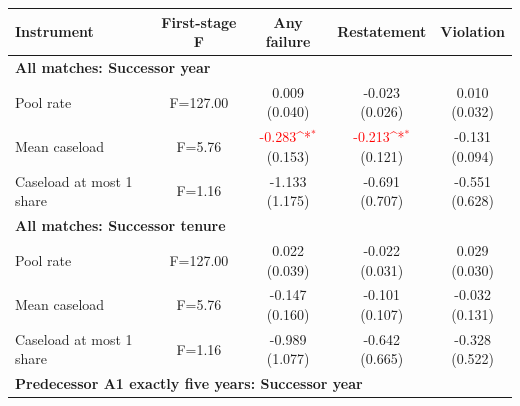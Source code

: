 \documentclass[10pt]{article}
\newcommand{\sym}[1]{\textsuperscript{#1}}
\begin{document}
\begin{minipage}{19cm}\fontsize{10}{12}\selectfont\setlength{\tabcolsep}{4pt}\renewcommand{\arraystretch}{1.12}


\def\sym#1{\ifmmode^{#1}\else\(^{#1}\)\fi}
\centering
{}
\begin{threeparttable}
\begin{tabular}{p{}cccc}
\toprule
Instrument & First-stage F & Any failure & Restatement & Violation \\
\midrule
\multicolumn{5}{l}{\textbf{All matches: Successor year}} \\
Pool rate & F=127.00 & \shortstack{0.009\\(0.040)} & \shortstack{-0.023\\(0.026)} & \shortstack{0.010\\(0.032)} \\
Mean caseload & F=5.76 & \shortstack{\textcolor{red}{-0.283\sym{*}}\\(0.153)} & \shortstack{\textcolor{red}{-0.213\sym{*}}\\(0.121)} & \shortstack{-0.131\\(0.094)} \\
Caseload at most 1 share & F=1.16 & \shortstack{-1.133\\(1.175)} & \shortstack{-0.691\\(0.707)} & \shortstack{-0.551\\(0.628)} \\
\multicolumn{5}{l}{\textbf{All matches: Successor tenure}} \\
Pool rate & F=127.00 & \shortstack{0.022\\(0.039)} & \shortstack{-0.022\\(0.031)} & \shortstack{0.029\\(0.030)} \\
Mean caseload & F=5.76 & \shortstack{-0.147\\(0.160)} & \shortstack{-0.101\\(0.107)} & \shortstack{-0.032\\(0.131)} \\
Caseload at most 1 share & F=1.16 & \shortstack{-0.989\\(1.077)} & \shortstack{-0.642\\(0.665)} & \shortstack{-0.328\\(0.522)} \\
\multicolumn{5}{l}{\textbf{Predecessor A1 exactly five years: Successor year}} \\

\end{tabular}
\end{threeparttable}
\end{minipage}
\end{document}
